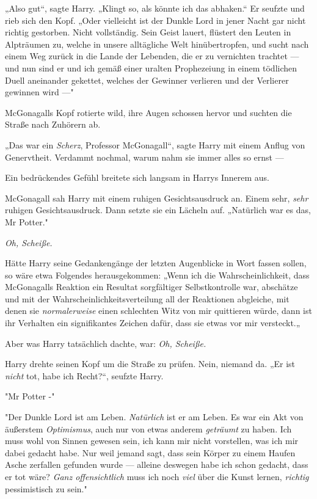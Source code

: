 {„Also gut“, sagte Harry. „Klingt so, als könnte ich das abhaken.“ Er seufzte und rieb sich den Kopf. „Oder vielleicht ist der Dunkle Lord in jener Nacht gar nicht richtig gestorben. Nicht vollständig. Sein Geist lauert, flüstert den Leuten in Alpträumen zu, welche in unsere alltägliche Welt hinübertropfen, und sucht nach einem Weg zurück in die Lande der Lebenden, die er zu vernichten trachtet --- und nun sind er und ich gemäß einer uralten Prophezeiung in einem tödlichen Duell aneinander gekettet, welches der Gewinner verlieren und der Verlierer gewinnen wird ---"

McGonagalls Kopf rotierte wild, ihre Augen schossen hervor und suchten die Straße nach Zuhörern ab.

„Das war ein \emph{Scherz}, Professor McGonagall“, sagte Harry mit einem Anflug von Genervtheit. Verdammt nochmal, warum nahm sie immer alles so ernst ---

Ein bedrückendes Gefühl breitete sich langsam in Harrys Innerem aus.

McGonagall sah Harry mit einem ruhigen Gesichtsausdruck an. Einem sehr, \emph{sehr} ruhigen Gesichtsausdruck. Dann setzte sie ein Lächeln auf. „Natürlich war es das, Mr Potter."

\emph{Oh, Scheiße.}

Hätte Harry seine Gedankengänge der letzten Augenblicke in Wort fassen sollen, so wäre etwa Folgendes herausgekommen: „Wenn ich die Wahrscheinlichkeit, dass McGonagalls Reaktion ein Resultat sorgfältiger Selbstkontrolle war, abschätze und mit der Wahrscheinlichkeitsverteilung all der Reaktionen abgleiche, mit denen sie \emph{normalerweise} einen schlechten Witz von mir quittieren würde, dann ist ihr Verhalten ein signifikantes Zeichen dafür, dass sie etwas vor mir versteckt.„

Aber was Harry tatsächlich dachte, war: \emph{Oh, Scheiße.}

Harry drehte seinen Kopf um die Straße zu prüfen. Nein, niemand da. „Er ist \emph{nicht} tot, habe ich Recht?“, seufzte Harry.

"Mr Potter -"

"Der Dunkle Lord ist am Leben. \emph{Natürlich} ist er am Leben. Es war ein Akt von äußerstem \emph{Optimismus}, auch nur von etwas anderem \emph{geträumt} zu haben. Ich muss wohl von Sinnen gewesen sein, ich kann mir nicht vorstellen, was ich mir dabei gedacht habe. Nur weil jemand sagt, dass sein Körper zu einem Haufen Asche zerfallen gefunden wurde --- alleine deswegen habe ich schon gedacht, dass er tot wäre? \emph{Ganz offensichtlich} muss ich noch \emph{viel} über die Kunst lernen, \emph{richtig} pessimistisch zu sein."

}

